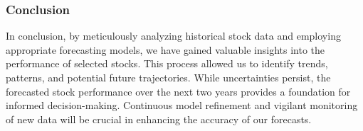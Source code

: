 \subsubsection{Conclusion}
In conclusion, by meticulously analyzing historical stock data and employing appropriate forecasting models, we have gained valuable insights into the performance of selected stocks. This process allowed us to identify trends, patterns, and potential future trajectories. While uncertainties persist, the forecasted stock performance over the next two years provides a foundation for informed decision-making. Continuous model refinement and vigilant monitoring of new data will be crucial in enhancing the accuracy of our forecasts.